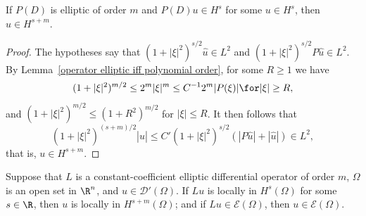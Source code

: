 \begin{lemma}\label{operator elliptic smoothing prop}
If $P(D)$ is elliptic of order $m$ and $P(D)u\in H^s$ for some $u\in H^s$, then $u\in H^{s+m}$.
\end{lemma}
\begin{proof}
The hypotheses say that $(1+|\xi|^2)^{s/2}\hat{u}\in L^2$ and $(1+|\xi|^2)^{s/2}P\hat{u}\in L^2$. By Lemma~\ref{operator elliptic iff polynomial order}, for some $R\geq 1$ we have
\[(1+|\xi|^2)^{m/2}\leq 2^m|\xi|^m\leq C^{-1}2^m|P(\xi)|\for |\xi|\geq R,\]
and $(1+|\xi|^2)^{m/2}\leq(1+R^2)^{m/2}$ for $|\xi|\leq R$. It then follows that
\[(1+|\xi|^2)^{(s+m)/2}|\hat{u}|\leq C'(1+|\xi|^2)^{s/2}(|P\hat{u}|+|\hat{u}|)\in L^2,\]
that is, $u\in H^{s+m}$.
\end{proof}
\begin{theorem}\label{operator elliptic regularity thm}
Suppose that $L$ is a constant-coefficient elliptic differential operator of order $m$, $\Omega$ is an open set in $\R^n$, and $u\in\mathscr{D}'(\Omega)$. If $Lu$ is locally in $H^{s}(\Omega)$ for some $s\in\R$, then $u$ is locally in $H^{s+m}(\Omega)$; and if $Lu\in\mathscr{E}(\Omega)$, then $u\in\mathscr{E}(\Omega)$.
\end{theorem}
